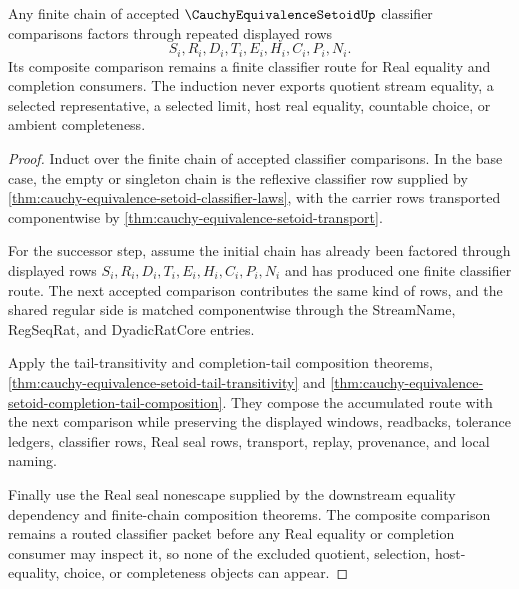 \begin{theorem}\label{thm:cauchy-equivalence-setoid-regular-chain-induction}
Any finite chain of accepted $\CauchyEquivalenceSetoidUp$ classifier comparisons factors through repeated displayed rows
$$
S_i,R_i,D_i,T_i,E_i,H_i,C_i,P_i,N_i .
$$
Its composite comparison remains a finite classifier route for Real equality and completion consumers. The induction never exports quotient stream equality, a selected representative, a selected limit, host real equality, countable choice, or ambient completeness.
\end{theorem}
\begin{proof}
Induct over the finite chain of accepted classifier comparisons. In the base case, the empty or singleton chain is the reflexive classifier row supplied by \autoref{thm:cauchy-equivalence-setoid-classifier-laws}, with the carrier rows transported componentwise by \autoref{thm:cauchy-equivalence-setoid-transport}.

For the successor step, assume the initial chain has already been factored through displayed rows $S_i,R_i,D_i,T_i,E_i,H_i,C_i,P_i,N_i$ and has produced one finite classifier route. The next accepted comparison contributes the same kind of rows, and the shared regular side is matched componentwise through the StreamName, RegSeqRat, and DyadicRatCore entries.

Apply the tail-transitivity and completion-tail composition theorems, \autoref{thm:cauchy-equivalence-setoid-tail-transitivity} and \autoref{thm:cauchy-equivalence-setoid-completion-tail-composition}. They compose the accumulated route with the next comparison while preserving the displayed windows, readbacks, tolerance ledgers, classifier rows, Real seal rows, transport, replay, provenance, and local naming.

Finally use the Real seal nonescape supplied by the downstream equality dependency and finite-chain composition theorems. The composite comparison remains a routed classifier packet before any Real equality or completion consumer may inspect it, so none of the excluded quotient, selection, host-equality, choice, or completeness objects can appear.
\end{proof}

